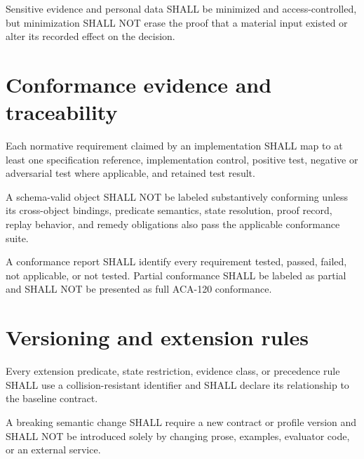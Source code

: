 \begin{requirement}[ACA-120-049]
Sensitive evidence and personal data SHALL be minimized and access-controlled,
but minimization SHALL NOT erase the proof that a material input existed or
alter its recorded effect on the decision.
\end{requirement}

\section{Conformance evidence and traceability}

\begin{requirement}[ACA-120-050]
Each normative requirement claimed by an implementation SHALL map to at least
one specification reference, implementation control, positive test, negative or
adversarial test where applicable, and retained test result.
\end{requirement}

\begin{requirement}[ACA-120-051]
A schema-valid object SHALL NOT be labeled substantively conforming unless its
cross-object bindings, predicate semantics, state resolution, proof record,
replay behavior, and remedy obligations also pass the applicable conformance
suite.
\end{requirement}

\begin{requirement}[ACA-120-052]
A conformance report SHALL identify every requirement tested, passed, failed,
not applicable, or not tested. Partial conformance SHALL be labeled as partial
and SHALL NOT be presented as full ACA-120 conformance.
\end{requirement}

\section{Versioning and extension rules}

\begin{requirement}[ACA-120-053]
Every extension predicate, state restriction, evidence class, or precedence rule
SHALL use a collision-resistant identifier and SHALL declare its relationship to
the baseline contract.
\end{requirement}

\begin{requirement}[ACA-120-054]
A breaking semantic change SHALL require a new contract or profile version and
SHALL NOT be introduced solely by changing prose, examples, evaluator code, or
an external service.
\end{requirement}

